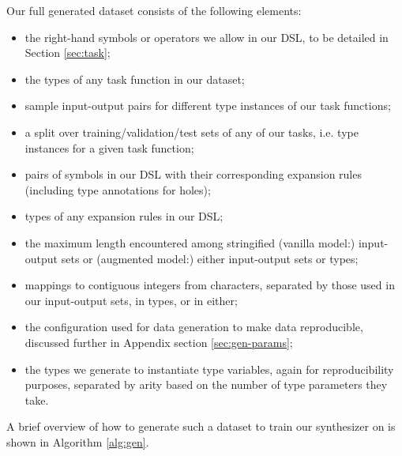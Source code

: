 \documentclass{article}
\begin{document}
Our full generated dataset consists of the following elements:
\begin{itemize}
    \item the right-hand symbols or operators we allow in our DSL, to be detailed in Section \ref{sec:task};
    \item the types of any task function in our dataset;
    \item sample input-output pairs for different type instances of our task functions;
    \item a split over training/validation/test sets of any of our tasks, i.e. type instances for a given task function;
    \item pairs of symbols in our DSL with their corresponding expansion rules (including type annotations for holes);
    \item types of any expansion rules in our DSL; %
    \item the maximum length encountered among stringified (vanilla model:) input-output sets or (augmented model:) either input-output sets or types;
    \item mappings to contiguous integers from characters, separated by those used in our input-output sets, in types, or in either;
    \item the configuration used for data generation to make data reproducible, discussed further in Appendix section \ref{sec:gen-params};
    \item the types we generate to instantiate type variables, again for reproducibility purposes, separated by arity based on the number of type parameters they take.
\end{itemize}

A brief overview of how to generate such a dataset to train our synthesizer on is shown in Algorithm \ref{alg:gen}.
\end{document}
